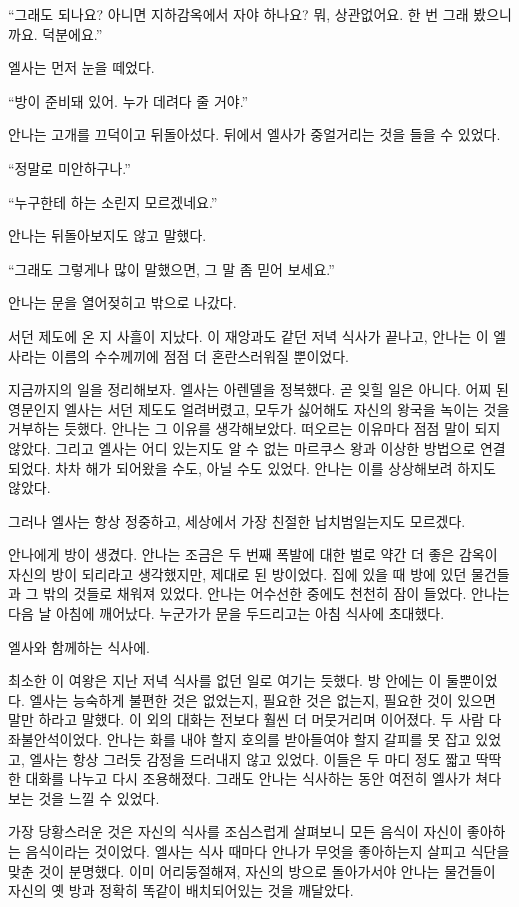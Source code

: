 ``그래도 되나요? 아니면 지하감옥에서 자야 하나요? 뭐, 상관없어요. 한 번 그래 봤으니까요. 덕분에요.''

엘사는 먼저 눈을 떼었다.

``방이 준비돼 있어. 누가 데려다 줄 거야.''

안나는 고개를 끄덕이고 뒤돌아섰다. 뒤에서 엘사가 중얼거리는 것을 들을 수 있었다.

``정말로 미안하구나.''

``누구한테 하는 소린지 모르겠네요.''

안나는 뒤돌아보지도 않고 말했다.

``그래도 그렇게나 많이 말했으면, 그 말 좀 믿어 보세요.''

안나는 문을 열어젖히고 밖으로 나갔다.

\textbreak

서던 제도에 온 지 사흘이 지났다. 이 재앙과도 같던 저녁 식사가 끝나고, 안나는 이 엘사라는 이름의 수수께끼에 점점 더 혼란스러워질 뿐이었다.

지금까지의 일을 정리해보자. 엘사는 아렌델을 정복했다. 곧 잊힐 일은 아니다. 어찌 된 영문인지 엘사는 서던 제도도 얼려버렸고, 모두가 싫어해도 자신의 왕국을 녹이는 것을 거부하는 듯했다. 안나는 그 이유를 생각해보았다. 떠오르는 이유마다 점점 말이 되지 않았다. 그리고 엘사는 어디 있는지도 알 수 없는 마르쿠스 왕과 이상한 방법으로 연결되었다. 차차 해가 되어왔을 수도, 아닐 수도 있었다. 안나는 이를 상상해보려 하지도 않았다.

그러나 엘사는 항상 정중하고, 세상에서 가장 친절한 납치범일는지도 모르겠다.

안나에게 방이 생겼다. 안나는 조금은 두 번째 폭발에 대한 벌로 약간 더 좋은 감옥이 자신의 방이 되리라고 생각했지만, 제대로 된 방이었다. 집에 있을 때 방에 있던 물건들과 그 밖의 것들로 채워져 있었다. 안나는 어수선한 중에도 천천히 잠이 들었다. 안나는 다음 날 아침에 깨어났다. 누군가가 문을 두드리고는 아침 식사에 초대했다.

엘사와 함께하는 식사에.

최소한 이 여왕은 지난 저녁 식사를 없던 일로 여기는 듯했다. 방 안에는 이 둘뿐이었다. 엘사는 능숙하게 불편한 것은 없었는지, 필요한 것은 없는지, 필요한 것이 있으면 말만 하라고 말했다. 이 외의 대화는 전보다 훨씬 더 머뭇거리며 이어졌다. 두 사람 다 좌불안석이었다. 안나는 화를 내야 할지 호의를 받아들여야 할지 갈피를 못 잡고 있었고, 엘사는 항상 그러듯 감정을 드러내지 않고 있었다. 이들은 두 마디 정도 짧고 딱딱한 대화를 나누고 다시 조용해졌다. 그래도 안나는 식사하는 동안 여전히 엘사가 쳐다보는 것을 느낄 수 있었다.

가장 당황스러운 것은 자신의 식사를 조심스럽게 살펴보니 모든 음식이 자신이 좋아하는 음식이라는 것이었다. 엘사는 식사 때마다 안나가 무엇을 좋아하는지 살피고 식단을 맞춘 것이 분명했다. 이미 어리둥절해져, 자신의 방으로 돌아가서야 안나는 물건들이 자신의 옛 방과 정확히 똑같이 배치되어있는 것을 깨달았다.

